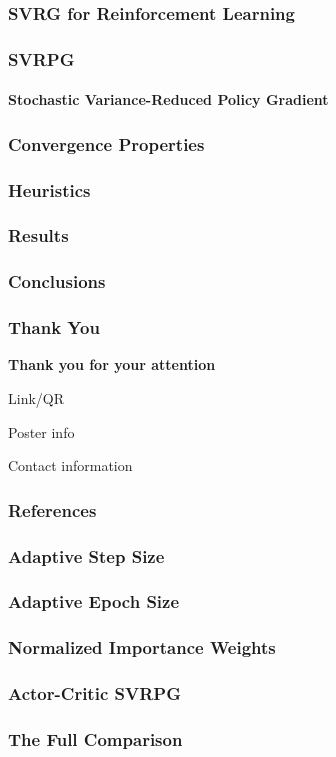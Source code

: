 \documentclass[aspectratio=169]{beamer}
\newcommand{\enb}[1]{\textcolor{poliblue1}{\textbf{#1}}}
\begin{document}
\begin{frame} 
\frametitle{SVRG for Reinforcement Learning} 

\end{frame}

\begin{frame} 
\frametitle{SVRPG} 
\framesubtitle{Stochastic Variance-Reduced \textbf{Policy} Gradient}

\end{frame}

\begin{frame} 
\frametitle{Convergence Properties} 

\end{frame}

\begin{frame} 
\frametitle{Heuristics} 

\end{frame}

\begin{frame} 
\frametitle{Results} 


\end{frame}

\begin{frame} 
\frametitle{Conclusions} 


\end{frame}


\begin{frame} 
\frametitle{Thank You} 
\begin{center}
	\Large{\enb{Thank you for your attention}}
\end{center}

Link/QR

Poster info

Contact information

\end{frame}


\begin{frame}
\frametitle{References}

\end{frame}

\begin{frame} 
\frametitle{Adaptive Step Size} 


\end{frame}

\begin{frame} 
\frametitle{Adaptive Epoch Size} 


\end{frame}

\begin{frame} 
\frametitle{Normalized Importance Weights} 


\end{frame}

\begin{frame} 
\frametitle{Actor-Critic SVRPG} 


\end{frame}

\begin{frame} 
\frametitle{The Full Comparison} 


\end{frame}
\end{document}

